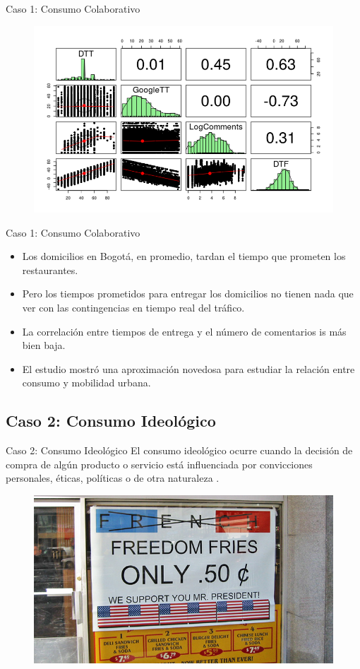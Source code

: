 \documentclass{beamer}
\begin{document}
\begin{frame}{Caso 1: Consumo Colaborativo}
\begin{figure}
\centering
 \includegraphics[width=.79\textwidth]{Fig4}
\end{figure}
\end{frame}

\begin{frame}{Caso 1: Consumo Colaborativo}
\begin{itemize}
    \item[1] Los domicilios en Bogotá, en promedio, tardan el tiempo que prometen los restaurantes.
    \pause
    \item[2] Pero los tiempos prometidos para entregar los domicilios no tienen nada que ver con las contingencias en tiempo real del tráfico.
    \pause
    \item[3] La correlación entre tiempos de entrega y el número de comentarios is más bien baja. 
    \pause
    \item[4] El estudio mostró una aproximación novedosa para estudiar la relación entre consumo y mobilidad urbana.
\end{itemize}
\end{frame}

\subsection{Caso 2: Consumo Ideológico}
\begin{frame}{Caso 2: Consumo Ideológico}
El consumo ideológico ocurre cuando la decisión de compra de algún producto o servicio está influenciada por convicciones personales, éticas, políticas o de otra naturaleza \cite{Correa2017}.
\begin{figure}
\centering
 \includegraphics[width=.6\textwidth]{freedomfries.jpeg}
\end{figure}    
\end{frame}
\end{document}
